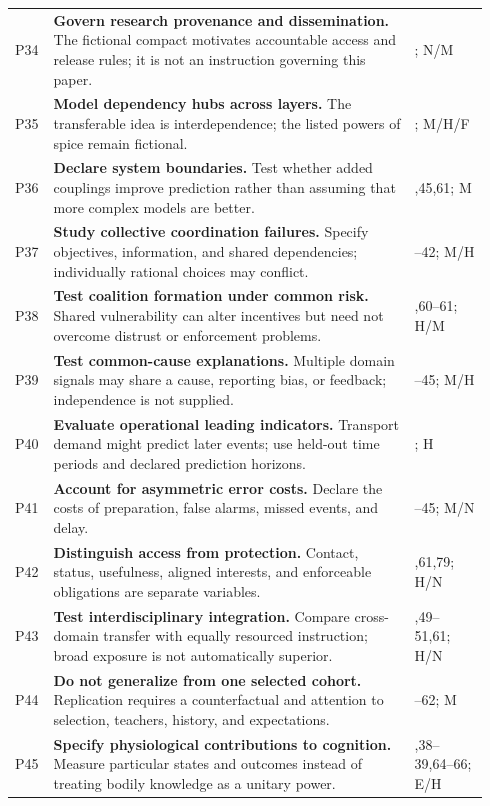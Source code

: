 \begin{longtable}{@{}>{\raggedright\arraybackslash}p{0.055\linewidth}>{\raggedright\arraybackslash}p{0.735\linewidth}>{\raggedright\arraybackslash}p{0.15\linewidth}@{}}
P34 & \textbf{Govern research provenance and dissemination.} The fictional compact motivates accountable access and release rules; it is not an instruction governing this paper. & 24; N/M\\[0.5em]
P35 & \textbf{Model dependency hubs across layers.} The transferable idea is interdependence; the listed powers of spice remain fictional. & 29; M/H/F\\[0.5em]
P36 & \textbf{Declare system boundaries.} Test whether added couplings improve prediction rather than assuming that more complex models are better. & 29,45,61; M\\[0.5em]
P37 & \textbf{Study collective coordination failures.} Specify objectives, information, and shared dependencies; individually rational choices may conflict. & 41--42; M/H\\[0.5em]
P38 & \textbf{Test coalition formation under common risk.} Shared vulnerability can alter incentives but need not overcome distrust or enforcement problems. & 42,60--61; H/M\\[0.5em]
P39 & \textbf{Test common-cause explanations.} Multiple domain signals may share a cause, reporting bias, or feedback; independence is not supplied. & 44--45; M/H\\[0.5em]
P40 & \textbf{Evaluate operational leading indicators.} Transport demand might predict later events; use held-out time periods and declared prediction horizons. & 44; H\\[0.5em]
P41 & \textbf{Account for asymmetric error costs.} Declare the costs of preparation, false alarms, missed events, and delay. & 44--45; M/N\\[0.5em]
P42 & \textbf{Distinguish access from protection.} Contact, status, usefulness, aligned interests, and enforceable obligations are separate variables. & 19,61,79; H/N\\[0.5em]
P43 & \textbf{Test interdisciplinary integration.} Compare cross-domain transfer with equally resourced instruction; broad exposure is not automatically superior. & 37,49--51,61; H/N\\[0.5em]
P44 & \textbf{Do not generalize from one selected cohort.} Replication requires a counterfactual and attention to selection, teachers, history, and expectations. & 61--62; M\\[0.5em]
P45 & \textbf{Specify physiological contributions to cognition.} Measure particular states and outcomes instead of treating bodily knowledge as a unitary power. & 18,38--39,64--66; E/H\\[0.5em]

\end{longtable}
